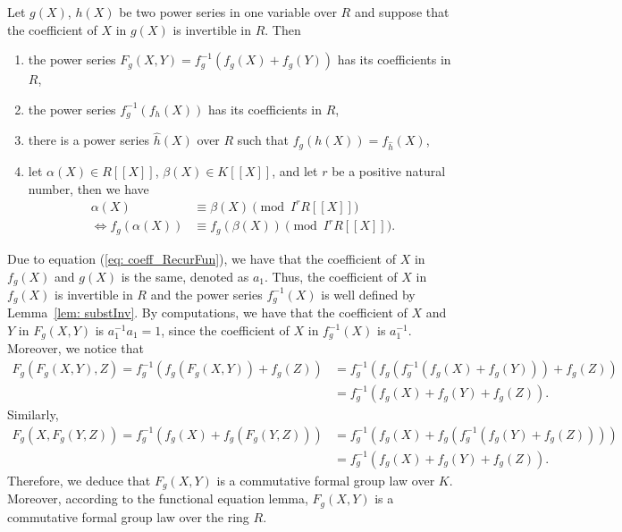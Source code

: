 
\begin{theorem}
Let $g (X)$, $h(X)$ be
two power series in one variable over $R$ and suppose that the coefficient of $X$ in $g(X)$
is invertible in $R$. Then
\begin{enumerate}
  \item the power series $F_g(X, Y) = f^{-1}_g(f_g(X) + f _g(Y))$ has its coefficients in $R$,
  \item the power series $f_g^{-1}(f_{h}(X))$ has its coefficients in $R$,
  \item there is a power series
  $\hat{h}(X)$ over $R$ such that
  $f _g (h(X)) = f _{\hat{h}}(X)$,
  \item let $\alpha(X)\in R [\![ X]\!]$, $\beta(X) \in K [\![X]\!]$, and let $r$ be a positive
    natural number, then we have
    \begin{align*}
    \alpha (X) &\equiv \beta (X) \pmod{I^r R[\![ X]\!]} \\
    \Leftrightarrow f_g(\alpha (X)) &\equiv f_g(\beta (X)) \pmod{I^r R[\![ X]\!]}.
    \end{align*}
\end{enumerate}
\label{thm: fun_eq}
\end{theorem}

\begin{remark}
    Due to equation (\ref{eq: coeff_RecurFun}), we have that the coefficient of $X$ in
    $f_g(X)$ and $g(X)$ is the same, denoted as $a_1$. Thus, the coefficient of $X$ in
    $f_g(X)$ is invertible in $R$ and
    the power series $f_g^{-1} (X)$ is well defined by Lemma~\ref{lem: substInv}. By computations,
    we have that the coefficient of $X$ and $Y$ in $F_g(X,Y)$ is $a_1^{-1} a_1 = 1$, since
    the coefficient of $X$ in $f_g^{-1} (X)$ is $a_1^{-1}$.
    Moreover, we notice that
    \begin{align*}
        F_g(F_g(X,Y),Z) = f_g^{-1}(f_g(F_g(X,Y)) + f_g(Z)) &=
            f_g^{-1}(f_g(f_g^{-1} (f_g(X) + f_g(Y))) + f_g(Z))\\
             &= f_g^{-1}(f_g(X) + f_g(Y) + f_g(Z)).
    \end{align*}
    Similarly,
    \begin{align*}
        F_g(X, F_g(Y,Z)) = f_g^{-1}(f_g(X) + f_g(F_g(Y,Z))) & =
            f_g^{-1}(f_g(X) + f_g(f_g^{-1}(f_g(Y) + f_g(Z)))) \\
            &= f_g^{-1}(f_g(X) + f_g(Y) + f_g(Z)).
    \end{align*}
    Therefore, we deduce that $F_g(X,Y)$ is a commutative formal group law over $K$.
    Moreover, according to the functional equation lemma, $F_g(X, Y)$ is a commutative formal group law
    over the ring $R$.
    \label{rem: fun_eq_FG}
\end{remark}

